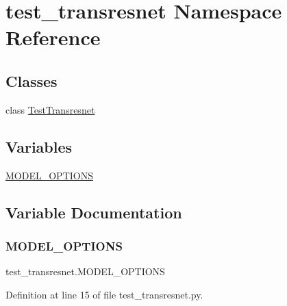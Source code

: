 \hypertarget{namespacetest__transresnet}{}\section{test\+\_\+transresnet Namespace Reference}
\label{namespacetest__transresnet}
\subsection*{Classes}
\begin{DoxyCompactItemize}
\item 
class \hyperlink{classtest__transresnet_1_1TestTransresnet}{Test\+Transresnet}
\end{DoxyCompactItemize}
\subsection*{Variables}
\begin{DoxyCompactItemize}
\item 
\hyperlink{namespacetest__transresnet_a10e75962db2c3ff451b88140dac09bc1}{M\+O\+D\+E\+L\+\_\+\+O\+P\+T\+I\+O\+NS}
\end{DoxyCompactItemize}


\subsection{Variable Documentation}
\mbox{\label{namespacetest__transresnet_a10e75962db2c3ff451b88140dac09bc1}} 
\subsubsection{\texorpdfstring{M\+O\+D\+E\+L\+\_\+\+O\+P\+T\+I\+O\+NS}{MODEL\_OPTIONS}}
{\footnotesize\ttfamily test\+\_\+transresnet.\+M\+O\+D\+E\+L\+\_\+\+O\+P\+T\+I\+O\+NS}



Definition at line 15 of file test\+\_\+transresnet.\+py.


